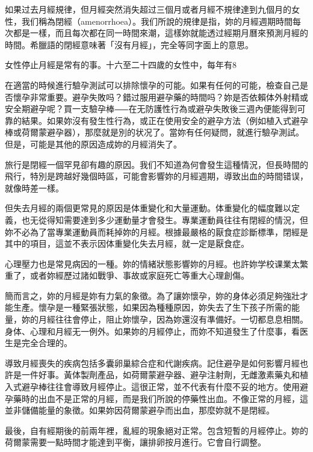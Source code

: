 \documentclass[12pt,UTF8]{ctexbook}
\begin{document}
如果过去月經規律，但月經突然消失超过三個月或者月經不規律達到九個月的女性，我们稱為閉經（amenorrhoea）。我们所說的規律是指，妳的月經週期時間每次都是一樣，而且每次都在同一時間來潮，這樣妳就能透过經期月曆來預測月經的時間。希臘語的閉經意味著「沒有月經」，完全等同字面上的意思。

女性停止月經是常有的事。十六至二十四歲的女性中，每年有8%

在適當的時候進行驗孕測試可以排除懷孕的可能。如果有任何的可能，檢查自己是否懷孕非常重要。避孕失敗吗？錯过服用避孕藥的時間吗？妳是否依賴体外射精或安全期避孕呢？買一支驗孕棒⸺在无防護性行為或避孕失敗後三週內便能得到可靠的結果。如果妳沒有發生性行為，或正在使用安全的避孕方法（例如植入式避孕棒或荷爾蒙避孕器），那麼就是別的状况了。當妳有任何疑問，就進行驗孕測試。但是，可能是其他的原因造成妳的月經消失了。

旅行是閉經一個罕見卻有趣的原因。我们不知道為何會發生這種情況，但長時間的飛行，特別是跨越好幾個時區，可能會影響妳的月經週期，導致出血的時間错误，就像時差一樣。

但失去月經的兩個更常見的原因是体重變化和大量運動。体重變化的幅度難以定義，也无從得知需要達到多少運動量才會發生。專業運動員往往有閉經的情況，但妳不必為了當專業運動員而耗掉妳的月經。根據最嚴格的厭食症診斷標準，閉經是其中的項目，這並不表示因体重變化失去月經，就一定是厭食症。

心理壓力也是常見病因的一種。妳的情緒狀態影響妳的月經。也許妳学校课業太繁重了，或者妳經歷过諸如戰爭、事故或家庭死亡等重大心理創傷。

簡而言之，妳的月經是妳有力氣的象徵。為了讓妳懷孕，妳的身体必須足夠強壯才能生產。懷孕是一種緊張狀態，如果因為種種原因，妳失去了生下孩子所需的能量，妳的月經往往會停止，阻止妳懷孕，因為妳還沒有準備好。一切都息息相關。身体、心理和月經无一例外。如果妳的月經停止，而妳不知道發生了什麼事，看医生是完全合理的。

導致月經喪失的疾病包括多囊卵巢綜合症和代謝疾病。記住避孕是如何影響月經也許是一件好事。黃体製劑產品，如荷爾蒙避孕器、避孕注射劑，无雌激素藥丸和植入式避孕棒往往會導致月經停止。這很正常，並不代表有什麼不妥的地方。使用避孕藥時的出血不是正常的月經，而是我们所說的停藥性出血。不像正常的月經，這並非儲備能量的象徵。如果妳因荷爾蒙避孕而出血，那麼妳就不是閉經。

最後，自有經期後的前兩年裡，亂經的現象絕对正常。包含短暫的月經停止。妳的荷爾蒙需要一點時間才能達到平衡，讓排卵按月進行。它會自行調整。
\end{document}
